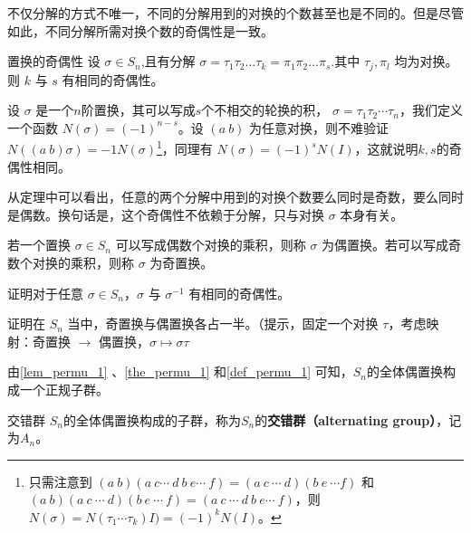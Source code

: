 不仅分解的方式不唯一，不同的分解用到的对换的个数甚至也是不同的。但是尽管如此，不同分解所需对换个数的奇偶性是一致。

\begin{theorem}{置换的奇偶性}\label{the_permu_1}
设 $\sigma\in S_n$,且有分解 $\sigma=\tau_1\tau_2...\tau_k=\pi_1\pi_2...\pi_s$.其中 $\tau_j, \pi_l$ 均为对换。则 $k$ 与 $s$ 有相同的奇偶性。
\end{theorem}
设 $\sigma$ 是一个$n$阶置换，其可以写成$s$个不相交的轮换的积， $\sigma=\tau_1\tau_2\cdots\tau_n$，我们定义一个函数 $N(\sigma)=(-1)^{n-s}$。设 $(a\ b)$ 为任意对换，则不难验证 $N((a\ b)\sigma)=-1N(\sigma)$\footnote{只需注意到 $(a\ b)(a\ c\cdots\ d\ b\ e\cdots\ f)=(a\ c\ \cdots\ d)(b\ e\ \cdots f)$ 和 $(a\ b)(a\ c\ \cdots\ d)(b\ e\ \cdots\ f)=(a\ c\ \cdots\ d\ b\ e\cdots\ f)$，则 $N(\sigma)=N(\tau_1\cdots \tau_k)I)=(-1)^kN(I)$。}，同理有 $N(\sigma)=(-1)^sN(I)$，这就说明$k,s$的奇偶性相同。


从定理中可以看出，任意的两个分解中用到的对换个数要么同时是奇数，要么同时是偶数。换句话是，这个奇偶性不依赖于分解，只与对换 $\sigma$ 本身有关。

\begin{definition}{}\label{def_permu_1}
若一个置换 $\sigma\in S_n$ 可以写成偶数个对换的乘积，则称 $\sigma$ 为偶置换。若可以写成奇数个对换的乘积，则称 $\sigma$ 为奇置换。
\end{definition}

\begin{exercise}{}
证明对于任意 $\sigma\in S_n$，$\sigma$ 与 $\sigma^{-1}$ 有相同的奇偶性。
\end{exercise}

\begin{exercise}{}
证明在 $S_n$ 当中，奇置换与偶置换各占一半。（提示，固定一个对换 $\tau$，考虑映射：奇置换 $\to$ 偶置换，$\sigma\mapsto\sigma\tau$
\end{exercise}


由\autoref{lem_permu_1} 、\autoref{the_permu_1} 和\autoref{def_permu_1} 可知，$S_n$的全体偶置换构成一个正规子群。

\begin{definition}{交错群}\label{def_permu_2}
$S_n$的全体偶置换构成的子群，称为$S_n$的\textbf{交错群（alternating group）}，记为$A_n$。
\end{definition}













